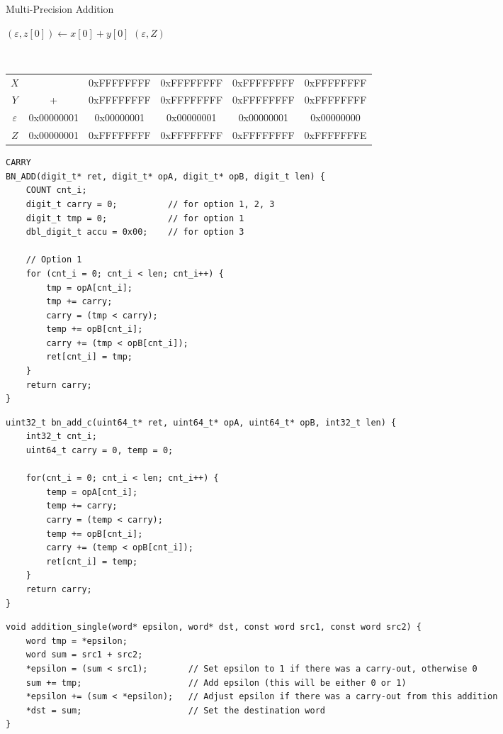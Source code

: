 \begin{algorithm}[H]
	\DontPrintSemicolon
	\caption{Multi-Precision Addition}
	\BlankLine
	$(\varepsilon,z[0])\gets x[0]+y[0]$\;
	\Return $(\varepsilon, Z)$
\end{algorithm}
\begin{example}
\ \begin{table}[h!]\centering\renewcommand{\arraystretch}{1.25}
{\ttfamily\begin{tabular*}{\textwidth}{@{\extracolsep{\fill}}cccccc}
	$X$ & & 0xFFFFFFFF & 0xFFFFFFFF & 0xFFFFFFFF & 0xFFFFFFFF \\
	$Y$ & + & 0xFFFFFFFF & 0xFFFFFFFF & 0xFFFFFFFF & 0xFFFFFFFF \\
	\color{red} $\varepsilon$ & \color{red}0x00000001 & \color{red}0x00000001 & \color{red}0x00000001 & \color{red}0x00000001 & \color{red}0x00000000 \\ \cline{2-6}
	$Z$ & 0x00000001 & 0xFFFFFFFF & 0xFFFFFFFF & 0xFFFFFFFF & 0xFFFFFFFE \\
\end{tabular*}}
\end{table}
\end{example}
\begin{lstlisting}[style=normal]
CARRY
BN_ADD(digit_t* ret, digit_t* opA, digit_t* opB, digit_t len) {
	COUNT cnt_i;
	digit_t carry = 0; 			// for option 1, 2, 3
	digit_t tmp = 0; 			// for option 1
	dbl_digit_t accu = 0x00; 	// for option 3
	
	// Option 1
	for (cnt_i = 0; cnt_i < len; cnt_i++) {
		tmp = opA[cnt_i];
		tmp += carry;
		carry = (tmp < carry);
		temp += opB[cnt_i];
		carry += (tmp < opB[cnt_i]);
		ret[cnt_i] = tmp;
	}
	return carry;
}
\end{lstlisting}
\begin{lstlisting}[style=normal]
uint32_t bn_add_c(uint64_t* ret, uint64_t* opA, uint64_t* opB, int32_t len) {
	int32_t cnt_i;
	uint64_t carry = 0, temp = 0;
	
	for(cnt_i = 0; cnt_i < len; cnt_i++) {
		temp = opA[cnt_i];
		temp += carry;
		carry = (temp < carry);
		temp += opB[cnt_i];
		carry += (temp < opB[cnt_i]);
		ret[cnt_i] = temp;
	}
	return carry;
}
\end{lstlisting}

\begin{lstlisting}[style=normal]
void addition_single(word* epsilon, word* dst, const word src1, const word src2) {
	word tmp = *epsilon;
	word sum = src1 + src2;
	*epsilon = (sum < src1); 		// Set epsilon to 1 if there was a carry-out, otherwise 0
	sum += tmp; 					// Add epsilon (this will be either 0 or 1)
	*epsilon += (sum < *epsilon); 	// Adjust epsilon if there was a carry-out from this addition
	*dst = sum; 					// Set the destination word
}
\end{lstlisting}
